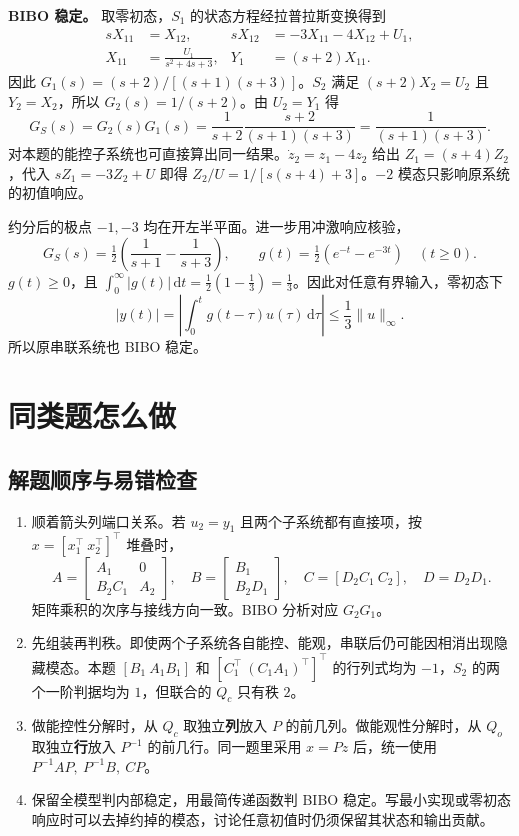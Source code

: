 \textbf{BIBO 稳定。} 取零初态，$S_1$ 的状态方程经拉普拉斯变换得到
\[
\begin{aligned}
   sX_{11}&=X_{12},&
   sX_{12}&=-3X_{11}-4X_{12}+U_1,\\
   X_{11}&=\frac{U_1}{s^2+4s+3},&
   Y_1&=(s+2)X_{11}.
\end{aligned}
\]
因此 $G_1(s)=(s+2)/[(s+1)(s+3)]$。$S_2$ 满足 $(s+2)X_2=U_2$ 且 $Y_2=X_2$，所以 $G_2(s)=1/(s+2)$。由 $U_2=Y_1$ 得
\[
     G_S(s)=G_2(s)G_1(s)
       =\frac{1}{s+2}\frac{s+2}{(s+1)(s+3)}
       =\frac{1}{(s+1)(s+3)}.
\]
对本题的能控子系统也可直接算出同一结果。$\dot z_2=z_1-4z_2$ 给出 $Z_1=(s+4)Z_2$，代入
$sZ_1=-3Z_2+U$ 即得 $Z_2/U=1/[s(s+4)+3]$。$-2$ 模态只影响原系统的初值响应。

约分后的极点 $-1,-3$ 均在开左半平面。进一步用冲激响应核验，
\[
    G_S(s)=\tfrac12\left(\frac1{s+1}-\frac1{s+3}\right),\qquad
    g(t)=\tfrac12(e^{-t}-e^{-3t})\quad(t\ge0).
\]
$g(t)\ge0$，且 $\int_0^\infty|g(t)|\,\mathrm dt=\frac12(1-\frac13)=\frac13$。因此对任意有界输入，零初态下
\[
    |y(t)|=\left|\int_0^t g(t-\tau)u(\tau)\,\mathrm d\tau\right|
       \le \frac13\|u\|_\infty .
\]
所以原串联系统也 BIBO 稳定。

\section{同类题怎么做}

\subsection{解题顺序与易错检查}

\begin{enumerate}
    \item 顺着箭头列端口关系。若 $u_2=y_1$ 且两个子系统都有直接项，按 $x=[x_1^\top\ x_2^\top]^\top$ 堆叠时，
    \[
       A=\begin{bmatrix}A_1&0\\B_2C_1&A_2\end{bmatrix},\quad
       B=\begin{bmatrix}B_1\\B_2D_1\end{bmatrix},\quad
       C=[D_2C_1\ C_2],\quad D=D_2D_1 .
    \]
    矩阵乘积的次序与接线方向一致。BIBO 分析对应 $G_2G_1$。
    \item 先组装再判秩。即使两个子系统各自能控、能观，串联后仍可能因相消出现隐藏模态。本题 $[B_1\ A_1B_1]$ 和 $[C_1^\top\ (C_1A_1)^\top]^\top$ 的行列式均为 $-1$，$S_2$ 的两个一阶判据均为 $1$，但联合的 $Q_c$ 只有秩 $2$。
    \item 做能控性分解时，从 $Q_c$ 取独立\textbf{列}放入 $P$ 的前几列。做能观性分解时，从 $Q_o$ 取独立\textbf{行}放入 $P^{-1}$ 的前几行。同一题里采用 $x=Pz$ 后，统一使用 $P^{-1}AP,\ P^{-1}B,\ CP$。
    \item 保留全模型判内部稳定，用最简传递函数判 BIBO 稳定。写最小实现或零初态响应时可以去掉约掉的模态，讨论任意初值时仍须保留其状态和输出贡献。
\end{enumerate}

